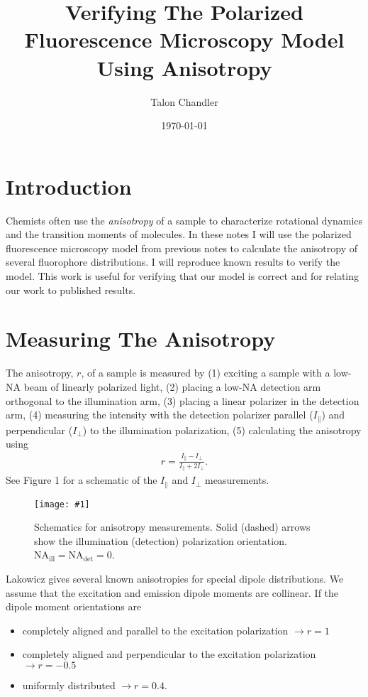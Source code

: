 \documentclass[11pt]{article}
\providecommand{\fig}[4]{
\begin{figure}[h]
 \captionsetup{width=1.0\linewidth}
 \centering
 \texttt{[image: \#1]}
 \caption{#3}
 \label{fig:#4}
\end{figure}
}
\begin{document}
\title{\vspace{-2.5em} Verifying The Polarized Fluorescence Microscopy Model Using Anisotropy \vspace{-1em}} \author{Talon
  Chandler}%
\date{\vspace{-1em}\today\vspace{-1em}}
\maketitle
\section{Introduction}
Chemists often use the \textit{anisotropy} of a sample to characterize
rotational dynamics and the transition moments of molecules. In these notes I
will use the polarized fluorescence microscopy model from previous notes to
calculate the anisotropy of several fluorophore distributions. I will reproduce
known results to verify the model. This work is useful for verifying that our
model is correct and for relating our work to published results.

\section{Measuring The Anisotropy}
The anisotropy, $r$, of a sample is measured by (1) exciting a sample with a
low-NA beam of linearly polarized light, (2) placing a low-NA detection arm
orthogonal to the illumination arm, (3) placing a linear polarizer in the
detection arm, (4) measuring the intensity with the detection polarizer parallel
($I_\parallel$) and perpendicular ($I_\perp$) to the illumination polarization,
(5) calculating the anisotropy using
\begin{align}
  r = \frac{I_\parallel - I_\perp}{I_\parallel + 2I_\perp}.
\end{align}
See Figure 1 for a schematic of the $I_\parallel$ and $I_\perp$ measurements.
\fig{../figures/schematic.pdf}{0.7}{Schematics for anisotropy
  measurements. Solid (dashed) arrows show the illumination (detection)
  polarization orientation.
  $\text{NA}_{\text{ill}} = \text{NA}_{\text{det}} = 0$.}{schematic}



Lakowicz \cite{lak} gives several known anisotropies for special dipole
distributions. We assume that the excitation and emission dipole moments are
collinear. If the dipole moment orientations are
\begin{itemize}
\item completely aligned and parallel to the excitation polarization
  $\rightarrow r = 1$
\item completely aligned and perpendicular to the excitation polarization
  $\rightarrow r = -0.5$
\item uniformly distributed $\rightarrow r=0.4$.
\end{itemize}
\end{document}
